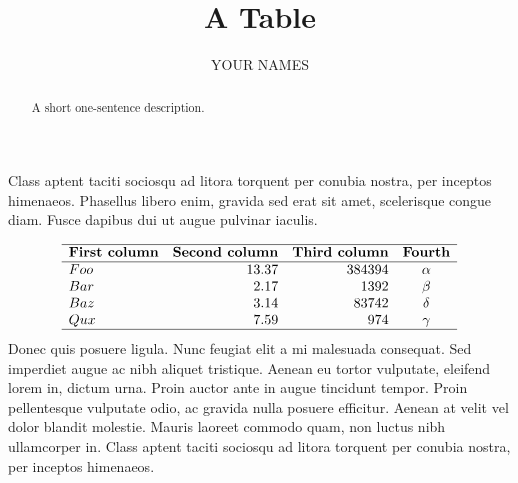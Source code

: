 \documentclass{ximera}
\author{YOUR NAMES}
\title{A Table}
\begin{document}
\begin{abstract}
    A short one-sentence description.
\end{abstract}
\maketitle

Class aptent taciti sociosqu ad litora torquent per conubia nostra, per
inceptos himenaeos. Phasellus libero enim, gravida sed erat sit amet,
scelerisque congue diam. Fusce dapibus dui ut augue pulvinar iaculis.

\[
  \begin{array}{l r r c}
    \hline
    \textbf{First column} & \textbf{Second column} & \textbf{Third column} & \textbf{Fourth} \\
    \hline
    Foo & 13.37 & 384394 & \alpha \\
    Bar & 2.17 & 1392 & \beta \\
    Baz & 3.14 & 83742 & \delta \\
    Qux & 7.59 & 974 & \gamma \\
    \hline
  \end{array}
\]
Donec quis posuere ligula. Nunc feugiat elit a mi malesuada consequat. Sed
imperdiet augue ac nibh aliquet tristique. Aenean eu tortor vulputate,
eleifend lorem in, dictum urna. Proin auctor ante in augue tincidunt
tempor. Proin pellentesque vulputate odio, ac gravida nulla posuere
efficitur. Aenean at velit vel dolor blandit molestie. Mauris laoreet
commodo quam, non luctus nibh ullamcorper in. Class aptent taciti sociosqu
ad litora torquent per conubia nostra, per inceptos himenaeos.
\end{document}
